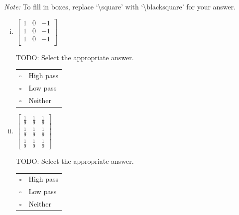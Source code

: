 \documentclass[11pt]{article}
\begin{document}
\begin{enumerate}[(a)]
\emph{Note:} To fill in boxes, replace `\textbackslash square' with `\textbackslash blacksquare' for your answer.

\begin{enumerate}[(i)]
\item
 $\begin{bmatrix}
    1 & 0 & -1 \\
    1 & 0 & -1 \\
    1 & 0 & -1 \\
 \end{bmatrix}$
\begin{tcolorbox}[colback=white!5!white,colframe=green!75!black]
TODO: Select the appropriate answer. %

\begin{tabular}[h]{ll}
$\square$ & High pass \\
$\square$ & Low pass \\
$\square$ & Neither \\
\end{tabular}

\end{tcolorbox}

\item
 $\begin{bmatrix}
    \frac{1}{9} & \frac{1}{9} & \frac{1}{9} \\
    \frac{1}{9} & \frac{1}{9} & \frac{1}{9} \\
    \frac{1}{9} & \frac{1}{9} & \frac{1}{9}
 \end{bmatrix}$
 \begin{tcolorbox}[colback=white!5!white,colframe=green!75!black]

TODO: Select the appropriate answer. %

\begin{tabular}[h]{ll}
$\square$ & High pass \\
$\square$ & Low pass \\
$\square$ & Neither \\
\end{tabular}

\end{tcolorbox}


\end{enumerate}
\end{enumerate}
\end{document}
